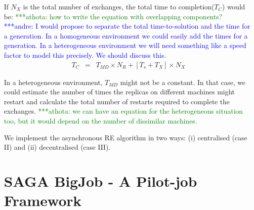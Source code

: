 \documentclass{rspublic}
\newcommand{\alnote}[1]{ {\textcolor{blue} { ***andre: #1 }}}
\newcommand{\athotanote}[1]{ {\textcolor{green} { ***athota: #1 }}}
\newcommand{\alnote}[1]{}
\newcommand{\athotanote}[1]{}
\begin{document}
If $N_{X}$ is the total number of exchanges, the total time to completion($T_{C}$) would be:
\athotanote{how to write the equation with overlapping components?}
\alnote{I would propose to separate the total time-to-solution and the time for a generation. 
In a homogeneous environment we could easily add the times for a generation. In a heterogeneous 
environment we will need something like a speed factor to model this precisely. We should discuss this.}
  \begin{eqnarray}
T_{C} &=& T_{MD} \times N_{R} + [T_{s} + T_{X}] \times N_{X}
\label{eq:equation 1}
\end{eqnarray}

In a heterogeneous environment, $T_{MD}$ might not be a constant. In that case, we could estimate the number of times the replicas on different machines might restart and calculate the total number of restarts required to complete the exchanges. \athotanote{we can have an equation for the heterogeneous situation too, but it would depend on the number of dissimilar machines.}

We implement the asynchronous RE algorithm in two ways: (i) centralised (case II) and (ii) decentralised (case III).




\section{SAGA BigJob - A Pilot-job Framework}
\end{document}
